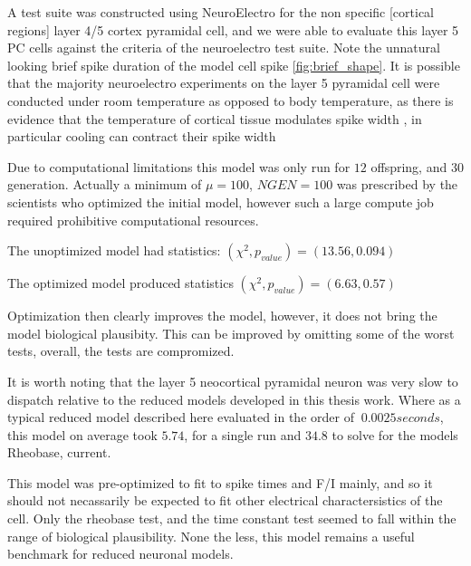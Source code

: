 A test suite was constructed using NeuroElectro for the non specific [cortical regions] layer 4/5 cortex pyramidal cell, and we were able to evaluate this layer 5 PC cells against the criteria of the neuroelectro test suite. Note the unnatural looking brief spike duration of the model cell spike  \ref{fig:brief_shape}. It is possible that the majority neuroelectro experiments on the layer 5 pyramidal cell were conducted under room temperature as opposed to body temperature, as there is evidence that the temperature of cortical tissue modulates spike width \cite{goldin2017temperature}, in particular cooling can contract their spike width

%


Due to computational limitations this model was only run for 
$12$ offspring, and $30$ generation. Actually a minimum of $\mu=100$, $NGEN =100$ was prescribed by the scientists who optimized the initial model, however such a large compute job required prohibitive computational resources.

The unoptimized model had statistics:
$(\chi^{2},p_{value})=(13.56, 0.094)$

The optimized model produced statistics
$(\chi^{2},p_{value})=(6.63, 0.57)$

Optimization then clearly improves the model, however, it does not bring the model  biological plausibity.
This can be improved by omitting some of the worst tests, overall, the tests are compromized.



It is worth noting that the layer 5 neocortical pyramidal neuron was very slow to dispatch relative to the reduced models developed in this thesis work. Where as a typical reduced model described here evaluated in the order of $~0.0025 seconds$, this model on average took $5.74$, for a single run and $34.8$ to solve for the models Rheobase, current.

This model was pre-optimized to fit to spike times and F/I mainly, and so it should not necassarily be expected to fit other electrical charactersistics of the cell. Only the rheobase test, and the time constant test seemed to fall within the range of biological plausibility.
None the less, this model remains a useful benchmark for reduced neuronal models.